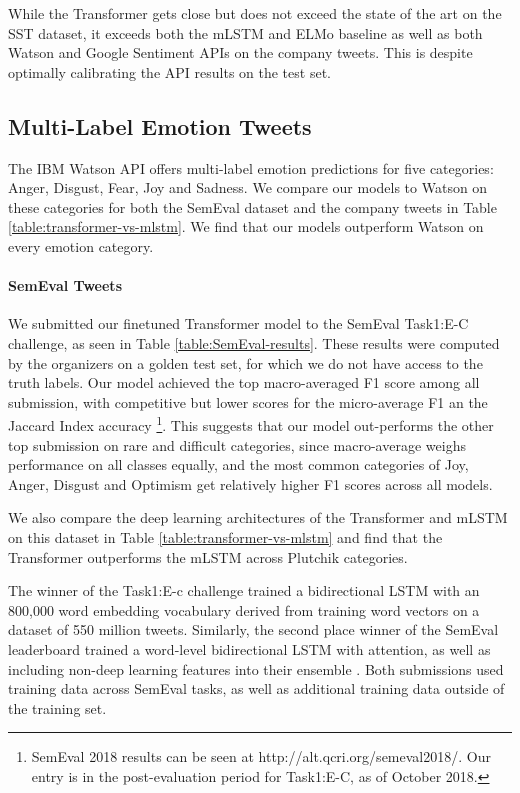 \documentclass[letterpaper]{article} \usepackage{aaai19}  \usepackage{times}  \usepackage{helvet}  \usepackage{courier}  \usepackage{url}  \usepackage{graphicx}  \usepackage{booktabs}
\begin{document}
While the Transformer gets close but does not exceed the state of the art on the SST dataset, it exceeds both the mLSTM and ELMo baseline as well as both Watson and Google Sentiment APIs on the company tweets. This is despite optimally calibrating the API results on the test set.


\subsection{Multi-Label Emotion Tweets}
The IBM Watson API offers multi-label emotion predictions for five categories: Anger, Disgust, Fear, Joy and Sadness. We compare our models to Watson on these categories for both the SemEval dataset and the company tweets in Table \ref{table:transformer-vs-mlstm}. We find that our models outperform Watson on every emotion category. 

\paragraph{SemEval Tweets}
We submitted our finetuned Transformer model to the SemEval Task1:E-C challenge, as seen in Table \ref{table:SemEval-results}. These results were computed by the organizers on a golden test set, for which we do not have access to the truth labels. Our model achieved the top macro-averaged F1 score among all submission, with competitive but lower scores for the micro-average F1 an the Jaccard Index accuracy \footnote{SemEval 2018 results can be seen at 
http://alt.qcri.org/semeval2018/. Our entry is  in the post-evaluation period for Task1:E-C, as of October 2018.}. This suggests that our model out-performs the other top submission on rare and difficult categories, since macro-average weighs performance on all classes equally, and the most common categories of Joy, Anger, Disgust and Optimism get relatively higher F1 scores across all models. 

We also compare the deep learning architectures of the Transformer and mLSTM on this dataset in Table \ref{table:transformer-vs-mlstm} and find that the Transformer outperforms the mLSTM across Plutchik categories.

The winner of the Task1:E-c challenge \cite{WinnerSemEval2018Task1} trained a bidirectional LSTM with an 800,000 word embedding vocabulary derived from training word vectors \cite{Mikolov2013} on a dataset of 550 million tweets. Similarly, the second place winner of the SemEval leaderboard trained a word-level bidirectional LSTM with attention, as well as including non-deep learning features into their ensemble \cite{ThirdPlaceSemEval2018Task1}. Both submissions used training data across SemEval tasks, as well as additional training data outside of the training set.
\end{document}
